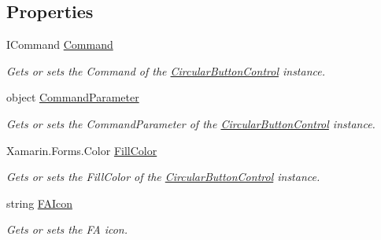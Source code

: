 \subsection*{Properties}
\begin{DoxyCompactItemize}
\item 
I\+Command \mbox{\hyperlink{class_tutor_scout24_1_1_controls_1_1_circular_button_control_ae661d29f62c71837ed9b347b9f654d55}{Command}}
\begin{DoxyCompactList}\small\item\em Gets or sets the Command of the \mbox{\hyperlink{class_tutor_scout24_1_1_controls_1_1_circular_button_control}{Circular\+Button\+Control}} instance. \end{DoxyCompactList}\item 
object \mbox{\hyperlink{class_tutor_scout24_1_1_controls_1_1_circular_button_control_a96e504109138c590d168abae62383dd2}{Command\+Parameter}}
\begin{DoxyCompactList}\small\item\em Gets or sets the Command\+Parameter of the \mbox{\hyperlink{class_tutor_scout24_1_1_controls_1_1_circular_button_control}{Circular\+Button\+Control}} instance. \end{DoxyCompactList}\item 
Xamarin.\+Forms.\+Color \mbox{\hyperlink{class_tutor_scout24_1_1_controls_1_1_circular_button_control_a0c757d1aaf6e3e6f1fa65a223ea4e7fa}{Fill\+Color}}
\begin{DoxyCompactList}\small\item\em Gets or sets the Fill\+Color of the \mbox{\hyperlink{class_tutor_scout24_1_1_controls_1_1_circular_button_control}{Circular\+Button\+Control}} instance. \end{DoxyCompactList}\item 
string \mbox{\hyperlink{class_tutor_scout24_1_1_controls_1_1_circular_button_control_aedda0b10ff9ea0cf299f0f971151d86c}{F\+A\+Icon}}
\begin{DoxyCompactList}\small\item\em Gets or sets the FA icon. \end{DoxyCompactList}\end{DoxyCompactItemize}


